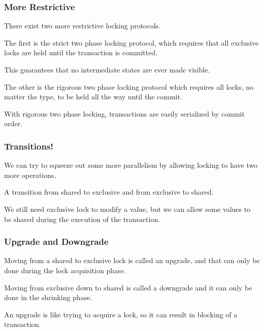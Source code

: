 \begin{frame}
\frametitle{More Restrictive}

There exist two more restrictive locking protocols.

The first is the strict two phase locking protocol, which requires that all exclusive locks are held until the transaction is committed.

This guarantees that no intermediate states are ever made visible.

The other is the rigorous two phase locking protocol which requires all locks, no matter the type, to be held all the way until the commit.

With rigorous two phase locking, transactions are easily serialized by commit order.

\end{frame}

\begin{frame}
\frametitle{Transitions!}

We can try to squeeze out some more parallelism by allowing locking to have two more operations. 

A transition from shared to exclusive and from exclusive to shared. 

We still need exclusive lock to modify a value, but we can allow some values to be shared during the execution of the transaction. 


\end{frame}

\begin{frame}
\frametitle{Upgrade and Downgrade}

Moving from a shared to exclusive lock is called an upgrade, and that can only be done during the lock acquisition phase.

 Moving from exclusive down to shared is called a downgrade and it can only be done in the shrinking phase.

An upgrade is like trying to acquire a lock, so it can result in blocking of a transaction.

\end{frame}

